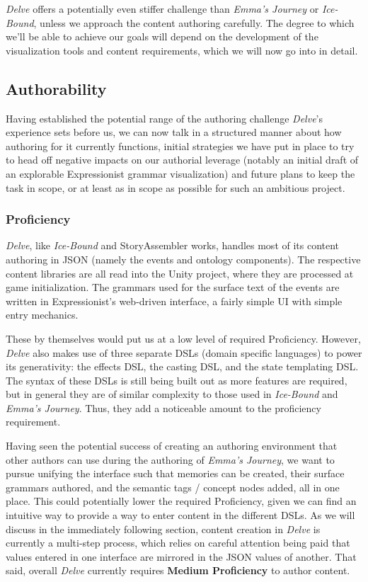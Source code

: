 \textit{Delve} offers a potentially even stiffer challenge than \textit{Emma's Journey} or \textit{Ice-Bound}, unless we approach the content authoring carefully. The degree to which we'll be able to achieve our goals will depend on the development of the visualization tools and content requirements, which we will now go into in detail.

\subsection{Authorability}\label{subsec:delve-authorability}

Having established the potential range of the authoring challenge \textit{Delve}'s experience sets before us, we can now talk in a structured manner about how authoring for it currently functions, initial strategies we have put in place to try to head off negative impacts on our authorial leverage (notably an initial draft of an explorable Expressionist grammar visualization) and future plans to keep the task in scope, or at least as in scope as possible for such an ambitious project.

\subsubsection{Proficiency}\label{subsubsec:delve-proficiency}

\textit{Delve}, like \textit{Ice-Bound} and StoryAssembler works, handles most of its content authoring in JSON (namely the events and ontology components). The respective content libraries are all read into the Unity project, where they are processed at game initialization. The grammars used for the surface text of the events are written in Expressionist's web-driven interface, a fairly simple UI with simple entry mechanics.

These by themselves would put us at a low level of required Proficiency. However, \textit{Delve} also makes use of three separate DSLs (domain specific languages) to power its generativity: the effects DSL, the casting DSL, and the state templating DSL. The syntax of these DSLs is still being built out as more features are required, but in general they are of similar complexity to those used in \textit{Ice-Bound} and \textit{Emma's Journey}. Thus, they add a noticeable amount to the proficiency requirement. 

Having seen the potential success of creating an authoring environment that other authors can use during the authoring of \textit{Emma's Journey}, we want to pursue unifying the interface such that memories can be created, their surface grammars authored, and the semantic tags / concept nodes added, all in one place. This could potentially lower the required Proficiency, given we can find an intuitive way to provide a way to enter content in the different DSLs. As we will discuss in the immediately following section, content creation in \textit{Delve} is currently a multi-step process, which relies on careful attention being paid that values entered in one interface are mirrored in the JSON values of another. That said, overall \textit{Delve} currently requires \textbf{Medium Proficiency} to author content.

